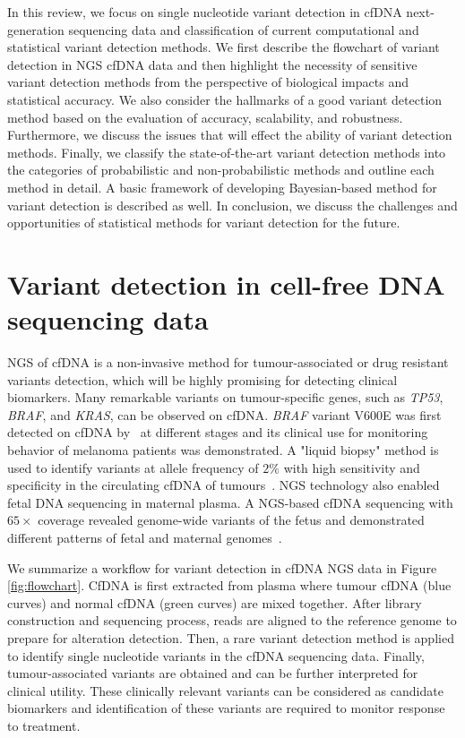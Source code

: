 \documentclass[a4,center,fleqn]{NAR}
\begin{document}
In this review, we focus on single nucleotide variant detection in cfDNA next-generation sequencing data and classification of current computational and statistical variant detection methods.
We first describe the flowchart of variant detection in NGS cfDNA data and then highlight the necessity of sensitive variant detection methods from the perspective of biological impacts and statistical accuracy.
We also consider the hallmarks of a good variant detection method based on the evaluation of accuracy, scalability, and robustness.
Furthermore, we discuss the issues that will effect the ability of variant detection methods.
Finally, we classify the state-of-the-art variant detection methods into the categories of probabilistic and non-probabilistic methods and outline each method in detail.
A basic framework of developing Bayesian-based method for variant detection is described as well.
In conclusion, we discuss the challenges and opportunities of statistical methods for variant detection for the future.

\clearpage

\section{Variant detection in cell-free DNA sequencing data}

NGS of cfDNA is a non-invasive method for tumour-associated or drug resistant variants detection, which will be highly promising for detecting clinical biomarkers. 
Many remarkable variants on tumour-specific genes, such as \textit{TP53}, \textit{BRAF}, and \textit{KRAS}, can be observed on cfDNA.
\textit{BRAF} variant V600E was first detected on cfDNA by~\citep{shinozaki2007utility} at different stages and its clinical use for monitoring behavior of melanoma patients was demonstrated.
A "liquid biopsy" method is used to identify variants at allele frequency of $2\%$ with high sensitivity and specificity in the circulating cfDNA of tumours~\citep{forshew2012noninvasive}.
NGS technology also enabled fetal DNA sequencing in maternal plasma.
A NGS-based cfDNA sequencing with $65\times$ coverage revealed genome-wide variants of the fetus and demonstrated different patterns of fetal and maternal genomes~\citep{lo2010maternal}.

We summarize a workflow for variant detection in cfDNA NGS data in Figure \ref{fig:flowchart}.
CfDNA is first extracted from plasma where tumour cfDNA (blue curves) and normal cfDNA (green curves) are mixed together.
After library construction and sequencing process, reads are aligned to the reference genome to prepare for alteration detection.
Then, a rare variant detection method is applied to identify single nucleotide variants in the cfDNA sequencing data.
Finally, tumour-associated variants are obtained and can be further interpreted for clinical utility.
These clinically relevant variants can be considered as candidate biomarkers and identification of these variants are required to monitor response to treatment.
\end{document}
